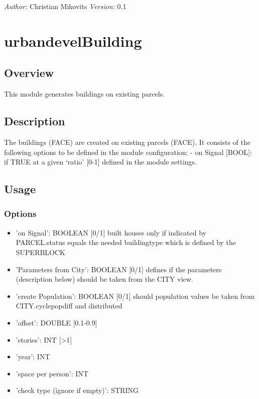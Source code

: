 \documentclass{scrartcl}
\begin{document}
\emph{Author:} Christian Mikovits\newline
\emph{Version:} 0.1

\section{urbandevelBuilding}\hypertarget{urbandevelbuilding}{}\label{urbandevelbuilding}

\subsection{Overview}\hypertarget{overview}{}\label{overview}

This module generates buildings on existing parcels.

\subsection{Description}\hypertarget{description}{}\label{description}

The buildings (FACE) are created on existing parcels (FACE).
It consists of the following options to be defined in the module configuration:
- on Signal [BOOL]: if TRUE  at a given `ratio' [0-1] defined in the module settings.

\subsection{Usage}\hypertarget{usage}{}\label{usage}

\subsubsection{Options}\hypertarget{options}{}\label{options}

\begin{itemize}
\item 'on Signal': BOOLEAN [0/1]\newline
  built houses only if indicated by PARCEL.status equals the needed buildingtype which is defined by the SUPERBLOCK
\item 'Parameters from City': BOOLEAN [0/1]\newline
  defines if the parameters (description below) should be taken from the CITY view.
\item 'create Population': BOOLEAN [0/1]\newline
  should population values be taken from CITY.cyclepopdiff and distributed
\item 'offset': DOUBLE [0.1-0.9]
\item 'stories': INT [\textgreater{}1]
\item 'year': INT
\item 'space per person': INT
\item 'check type (ignore if empty)': STRING
\end{itemize}
\end{document}
